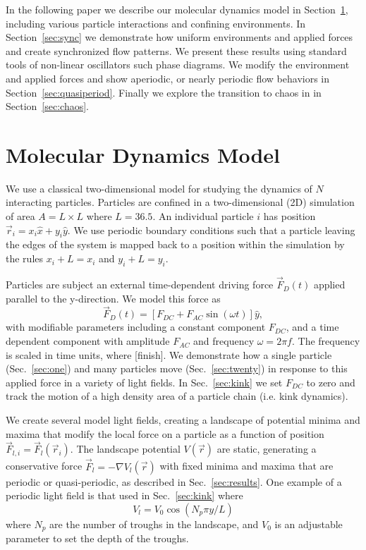 \documentclass[prb,preprint]{revtex4}
\begin{document}
In the following paper we describe
our molecular dynamics model in Section~\ref{sec:MD},
including various particle interactions and confining environments.
In Section~\ref{sec:sync} we
demonstrate how uniform environments and applied forces
and create synchronized flow patterns.
We present these results using standard tools of non-linear oscillators
such phase diagrams.
We modify the environment and applied forces
and show aperiodic, or nearly periodic flow behaviors
in Section~\ref{sec:quasiperiod}.
Finally we explore the transition to chaos in 
in Section~\ref{sec:chaos}.



\section{Molecular Dynamics Model}
\label{sec:MD}
We use a classical two-dimensional model for 
studying the dynamics of $N$ interacting particles. 
Particles are confined in a two-dimensional (2D) 
simulation of area $A = L \times L$ where $L=36.5$.
An individual particle $i$ has
position $\vec{r}_i = x_i \hat{x} + y_i \hat{y}$.
We use periodic boundary conditions
such that a particle leaving the edges of the system is mapped
back to a position within the simulation 
by the rules $x_i+L=x_i$ and $y_i+L=y_i$.

Particles are subject an external time-dependent driving force
$\vec{F}_{D}(t)$
applied parallel to the y-direction.
We model this force as
\begin{equation}
\vec{F}_{D}(t) = [F_{DC} + F_{AC} \sin(\omega t)] \hat{y},
\end{equation}
with modifiable parameters including
a constant component $F_{DC}$,
and a time dependent component with amplitude $F_{AC}$
and frequency $\omega = 2 \pi f$.
The frequency is scaled in time units,
where [finish].
 We demonstrate how a single particle (Sec.~\ref{sec:one})
 and many particles
 move (Sec.~\ref{sec:twenty})
 in response to this applied force in a variety of light fields.
 In Sec.~\ref{sec:kink} we set $F_{DC}$
 to zero and track the motion
 of a high density area of a particle chain
 (i.e. kink dynamics).

 We create several model light fields,
 creating a landscape of potential minima and maxima
 that modify the local force on a particle as a function of position
 $\vec{F}_{l,i} = \vec{F}_{l}(\vec{r}_i).$
 The landscape potential $V(\vec{r}) $ are static,
 generating a conservative force $\vec{F}_l= -\nabla V_l(\vec{r})$
 with fixed minima and maxima
 that are periodic or quasi-periodic,
 as described in Sec.~\ref{sec:results}.
 One example of a periodic light field is
 that used in Sec.~\ref{sec:kink}
 where 
 \begin{equation}
   V_l = V_0 \cos{(N_p \pi y / L)}
 \end{equation}
 where $N_p$ are the number of troughs in the landscape,
 and $V_0$ is an adjustable parameter
 to set the depth of the troughs.
 
\end{document}
